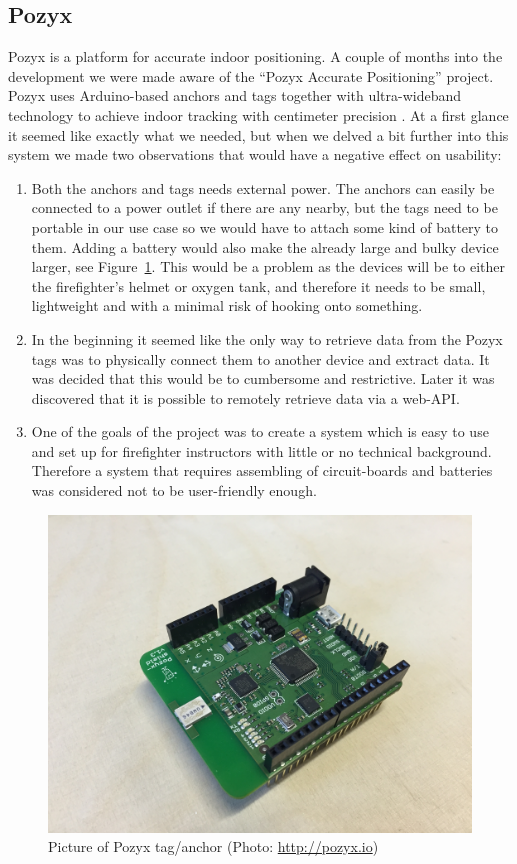 \documentclass[../Main/thesis.tex]{subfiles}
\begin{document}
\subsection{Pozyx}
Pozyx is a platform for accurate indoor positioning.
A couple of months into the development we were made aware of the ``Pozyx Accurate Positioning'' project.
Pozyx uses Arduino-based anchors and tags together with ultra-wideband technology to achieve indoor tracking with centimeter precision \citep{Pozyx2017}.
At a first glance it seemed like exactly what we needed, but when we delved a bit further into this system we made two observations that would have a negative effect on usability:
\begin{enumerate}
	\item{Both the anchors and tags needs external power. 
		The anchors can easily be connected to a power outlet if there are any nearby, but the tags need to be portable in our use case so we would have to attach some kind of battery to them.
		Adding a battery would also make the already large and bulky device larger, see Figure~\ref{fig:pozyx_tag}.
		This would be a problem as the devices will be to either the firefighter's helmet or oxygen tank, and therefore it needs to be small, lightweight and with a minimal risk of hooking onto something.
	}

	\item{In the beginning it seemed like the only way to retrieve data from the Pozyx tags was to physically connect them to another device and extract data.
		It was decided that this would be to cumbersome and restrictive.
		Later it was discovered that it is possible to remotely retrieve data via a web-API.}

	\item{One of the goals of the project was to create a system which is easy to use and set up for firefighter instructors with little or no technical background.
		Therefore a system that requires assembling of circuit-boards and batteries was considered not to be user-friendly enough.}
\end{enumerate}

\begin{figure}
	\centering
	\includegraphics[width=0.5\linewidth]{../fig/pozyx_tag}
	\caption{Picture of Pozyx tag/anchor (Photo: \url{http://pozyx.io})}
	\label{fig:pozyx_tag}
\end{figure}
\end{document}
